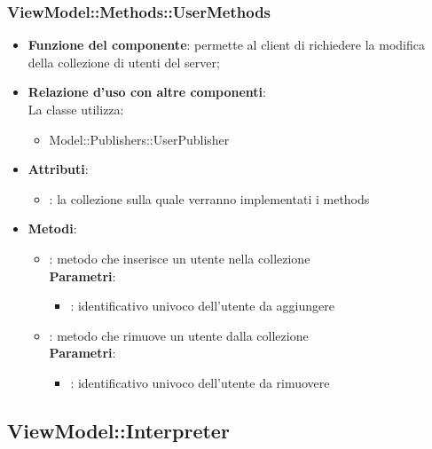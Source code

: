 \subsubsection{ViewModel::Methods::UserMethods}
\begin{itemize}
\item\textbf{Funzione del componente}: permette al client di richiedere la modifica della collezione di utenti del server;
	\item\textbf{Relazione d'uso con altre componenti}: \\
La classe utilizza:
	\begin{itemize}
		\item Model::Publishers::UserPublisher
	\end{itemize}
\item\textbf{Attributi}:
	\begin{itemize}
		\item{}: la collezione sulla quale verranno implementati i methods\\
	\end{itemize}
\item\textbf{Metodi}:
	\begin{itemize}
		\item{}: metodo che inserisce un utente nella collezione\\
		\textbf{Parametri}:
			\begin{itemize}
				\item{}: identificativo univoco dell'utente da aggiungere\\
			\end{itemize}
		\item{}: metodo che rimuove un utente dalla collezione\\
		\textbf{Parametri}:
			\begin{itemize}
				\item{}: identificativo univoco dell'utente da rimuovere\\
			\end{itemize}
	\end{itemize}
\end{itemize}

\subsection{ViewModel::Interpreter}

